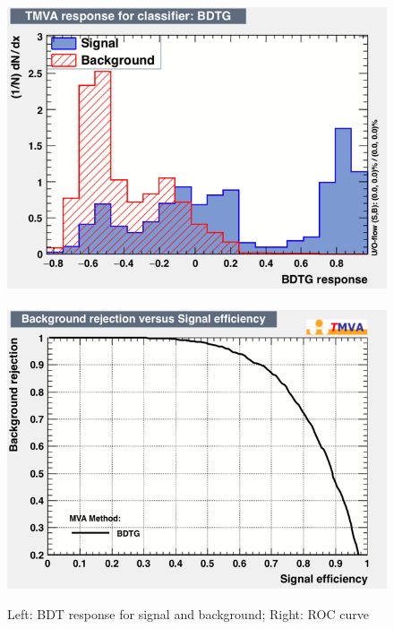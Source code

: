 \begin{figure}[h!]
	\includegraphics[scale=0.40]{Plots/BDT_Performance/Trial1/dataset/plots/mva_BDTG.png}%
	~
	\includegraphics[scale=0.40]{Plots/BDT_Performance/Trial1/dataset/plots/rejBvsS.png}
	\caption{Left: BDT response for signal and background; Right: ROC curve}
\end{figure}

